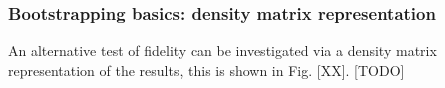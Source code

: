 \subsubsection{Bootstrapping basics: density matrix representation}

An alternative test of fidelity can be investigated via a density matrix representation of the results, this is shown in Fig. [XX]. [TODO]